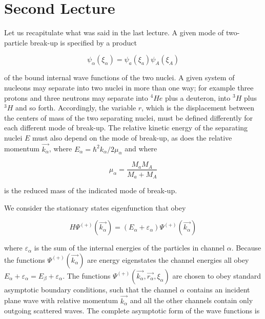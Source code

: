
\chapter{Second Lecture}\label{C3}


Let us recapitulate what was said in the last lecture. A given mode of two-particle break-up is specified by a product

\begin{equation}
\psi_{\alpha}(\xi_{\alpha}) = \psi_a (\xi_a) \psi_A (\xi_A)
\end{equation}

\noindent of the bound internal wave functions of the two nuclei. A given system of nucleons may separate into two nuclei in more than one way; for example three protons and three neutrons may separate into $^4 He$  plus a deuteron, into $^3 H$ plus $^3 H$ and so forth. Accordingly, the variable $r$, which is the displacement between the centers of mass of the two separating nuclei, must be defined differently for each different mode of break-up. The relative kinetic energy of the separating nuclei $E$ must also depend on the mode of break-up, as does the relative momentum $\vec{k_{\alpha}}$, where $E_{\alpha}=\hbar^2 k_{\alpha}/2\mu_{\alpha}$ and where

\begin{equation}
\mu_{\alpha} = \frac{M_a M_A}{M_a+M_A}
\end{equation}

\noindent is the reduced mass of the indicated mode of break-up.

We consider the stationary states eigenfunction that obey

\begin{equation}
H \Psi^{(+)}(\vec{k_{\alpha}}) = (E_{\alpha}+\varepsilon_{\alpha}) \Psi^{(+)} (\vec{k_{\alpha}})
\end{equation}

\noindent where $\varepsilon_{\alpha}$ is the sum of the internal energies of the particles in channel $\alpha$. Because the functions $\Psi^{(+)}(\vec{k_{\alpha}})$ are energy eigenstates the channel energies all obey $E_{\alpha}+\varepsilon_{\alpha}=E_{\beta}+\varepsilon_{\alpha}$. The functions $\Psi^{(+)}(\vec{k_{\alpha}},\vec{r_{\alpha}}, \xi_{\alpha})$ are chosen to obey standard asymptotic boundary conditions, such that the channel $\alpha$ contains an incident plane wave with relative momentum $\vec{k_{\alpha}}$ and all the other channels contain only outgoing scattered waves. The complete asymptotic form of the wave functions is

